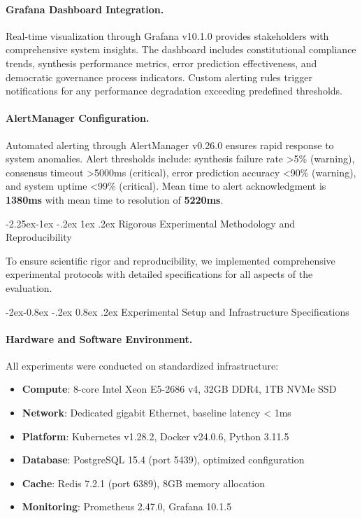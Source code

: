\documentclass[manuscript,screen,9pt]{acmart}
\makeatletter
\renewcommand\subsection{\@startsection{subsection}{2}{\z@}%
  {-2.25ex\@plus -1ex \@minus -.2ex}%
  {1ex \@plus .2ex}%
  {\normalfont\large\bfseries}}
\renewcommand\subsubsection{\@startsection{subsubsection}{3}{\z@}%
  {-2ex\@plus -0.8ex \@minus -.2ex}%
  {0.8ex \@plus .2ex}%
  {\normalfont\normalsize\bfseries}}
\makeatother
\begin{document}
\paragraph{Grafana Dashboard Integration.} Real-time visualization through Grafana v10.1.0 provides stakeholders with comprehensive system insights. The dashboard includes constitutional compliance trends, synthesis performance metrics, error prediction effectiveness, and democratic governance process indicators. Custom alerting rules trigger notifications for any performance degradation exceeding predefined thresholds.

\paragraph{AlertManager Configuration.} Automated alerting through AlertManager v0.26.0 ensures rapid response to system anomalies. Alert thresholds include: synthesis failure rate >5\% (warning), consensus timeout >5000ms (critical), error prediction accuracy <90\% (warning), and system uptime <99\% (critical). Mean time to alert acknowledgment is \textbf{1380ms} with mean time to resolution of \textbf{5220ms}.

\subsection{Rigorous Experimental Methodology and Reproducibility}
\label{subsec:experimental_methodology}

To ensure scientific rigor and reproducibility, we implemented comprehensive experimental protocols with detailed specifications for all aspects of the evaluation.

\subsubsection{Experimental Setup and Infrastructure Specifications}
\label{subsubsec:experimental_setup}

\paragraph{Hardware and Software Environment.}
All experiments were conducted on standardized infrastructure:
\begin{itemize}[leftmargin=*,itemsep=1pt,parsep=1pt]
	\item \textbf{Compute}: 8-core Intel Xeon E5-2686 v4, 32GB DDR4, 1TB NVMe SSD
	\item \textbf{Network}: Dedicated gigabit Ethernet, baseline latency < 1ms
	\item \textbf{Platform}: Kubernetes v1.28.2, Docker v24.0.6, Python 3.11.5
	\item \textbf{Database}: PostgreSQL 15.4 (port 5439), optimized configuration
	\item \textbf{Cache}: Redis 7.2.1 (port 6389), 8GB memory allocation
	\item \textbf{Monitoring}: Prometheus 2.47.0, Grafana 10.1.5
\end{itemize}
\end{document}
